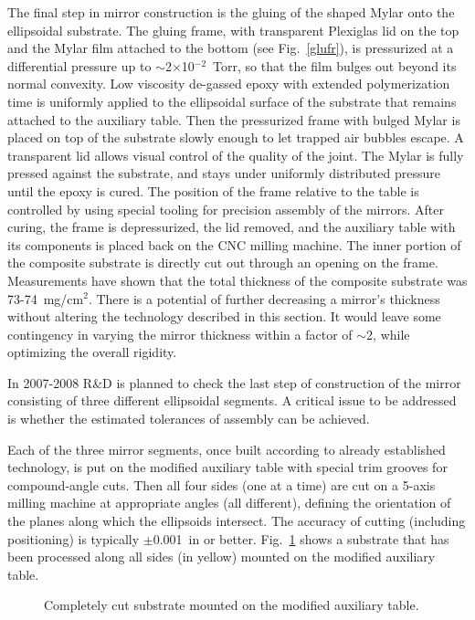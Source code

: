 The final step in mirror construction is the gluing of the shaped Mylar 
onto the ellipsoidal substrate.  The gluing frame, with transparent 
Plexiglas lid on the top and the Mylar film attached to the bottom (see 
Fig.~\ref{glufr}), is pressurized at a differential pressure up to 
$\sim$2$\times$10$^{-2}$~Torr, so that the film bulges out beyond its 
normal convexity.  Low viscosity de-gassed epoxy with extended 
polymerization time is uniformly applied to the ellipsoidal surface of 
the substrate that remains attached to the auxiliary table.  Then the 
pressurized frame with bulged Mylar is placed on top of the substrate 
slowly enough to let trapped air bubbles escape. A transparent lid allows 
visual control of the quality of the joint.  The Mylar is fully pressed 
against the substrate, and stays under uniformly distributed pressure 
until the epoxy is cured.  The position of the frame relative to the table 
is controlled by using special tooling for precision assembly of the mirrors.  
After curing, the frame is depressurized, the lid removed, and the auxiliary 
table with its components is placed back on the CNC milling machine.  The 
inner portion of the composite substrate is directly cut out through an 
opening on the frame.  Measurements have shown that the total thickness of 
the composite substrate was 73-74~mg/cm$^2$.  There is a potential of 
further decreasing a mirror's thickness without altering the technology 
described in this section.  It would leave some contingency in varying the 
mirror thickness within a factor of $\sim$2, while optimizing the overall 
rigidity.

In 2007-2008 R\&D is planned to check the last step of construction of the
mirror consisting of three different ellipsoidal segments.  A critical 
issue to be addressed is whether the estimated tolerances of assembly can 
be achieved. 

Each of the three mirror segments, once built according to already 
established technology, is put on the modified auxiliary table with special 
trim grooves for compound-angle cuts. Then all four sides (one at a time) 
are cut on a 5-axis milling machine at appropriate angles (all different), 
defining the orientation of the planes along which the ellipsoids intersect.  
The accuracy of cutting (including positioning) is typically $\pm$0.001~in 
or better. Fig.~\ref{compl_cut} shows a substrate that has been processed 
along all sides (in yellow) mounted on the modified auxiliary table.

\begin{figure}
\begin{center}
\caption{\small{Completely cut substrate mounted on the modified auxiliary 
table.}}
\label{compl_cut}
\end{center}
\end{figure}

